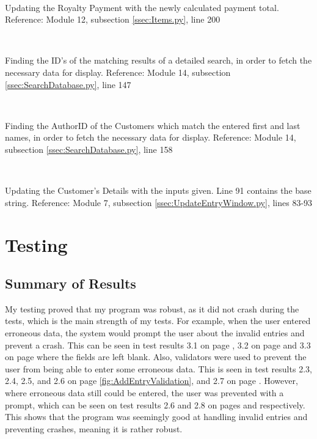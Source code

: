 \

Updating the Royalty Payment with the newly calculated payment total.
Reference: Module 12,  subsection \ref{ssec:Items.py}, line 200

\

Finding the ID's of the matching results of a detailed search, in order to fetch the necessary data for display.
Reference: Module 14,  subsection \ref{ssec:SearchDatabase.py}, line 147

\

Finding the AuthorID of the Customers which match the entered first and last names, in order to fetch the necessary data for display.
Reference: Module 14,  subsection \ref{ssec:SearchDatabase.py}, line 158

\

Updating the Customer's Details with the inputs given. Line 91 contains the base string.
Reference: Module 7,  subsection \ref{ssec:UpdateEntryWindow.py}, lines 83-93


\section{Testing}

\subsection{Summary of Results}

My testing proved that my program was robust, as it did not crash during the tests, which is the main strength of my tests. For example, when the user entered erroneous data, the system would prompt the user about the invalid entries and prevent a crash. This can be seen in test results 3.1 on page \pageref{fig:AddBookValidation}, 3.2 on page \pageref{fig:AddInvoiceItemTest} and 3.3 on page \pageref{fig:AddRoyaltyItemTest} where the fields are left blank. Also, validators were used to prevent the user from being able to enter some erroneous data. This is seen in test results 2.3, 2.4, 2.5, and 2.6 on page \ref{fig:AddEntryValidation}, and 2.7 on page \pageref{fig:ISBNRejection}. However, where erroneous data still could be entered, the user was prevented with a prompt, which can be seen on test results 2.6 and 2.8 on pages \pageref{fig:InvalidAddress} and \pageref{fig:PagesRejection} respectively. This shows that the program was seemingly good at handling invalid entries and preventing crashes, meaning it is rather robust.

